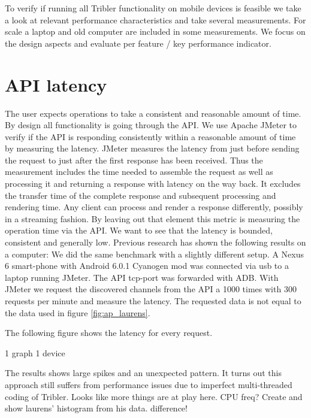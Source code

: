 
To verify if running all Tribler functionality on mobile devices is feasible we take a look at relevant performance characteristics and take several measurements.
For scale a laptop and old computer are included in some measurements.
We focus on the design aspects and evaluate per feature / key performance indicator.


\section{API latency}
The user expects operations to take a consistent and reasonable amount of time.
By design all functionality is going through the API.
We use Apache JMeter to verify if the API is responding consistently within a reasonable amount of time by measuring the latency.
JMeter measures the latency from just before sending the request to just after the first response has been received. \cite{jmeter_glossary}
Thus the measurement includes the time needed to assemble the request as well as processing it and returning a response with latency on the way back.
It excludes the transfer time of the complete response and subsequent processing and rendering time.
Any client can process and render a response differently, possibly in a streaming fashion.
By leaving out that element this metric is measuring the operation time via the API.
We want to see that the latency is bounded, consistent and generally low.
Previous research has shown the following results on a computer:
We did the same benchmark with a slightly different setup.
A Nexus 6 smart-phone with Android 6.0.1 Cyanogen mod was connected via usb to a laptop running JMeter.
The API tcp-port was forwarded with ADB.
With JMeter we request the discovered channels from the API a 1000 times with 300 requests per minute and measure the latency.
The requested data is not equal to the data used in figure \ref{fig:ap_laurens}.


The following figure shows the latency for every request.

1 graph
1 device

The results shows large spikes and an unexpected pattern.
It turns out this approach still suffers from performance issues due to imperfect multi-threaded coding of Tribler.
Looks like more things are at play here.
CPU freq?
Create and show laurens' histogram from his data. difference!


